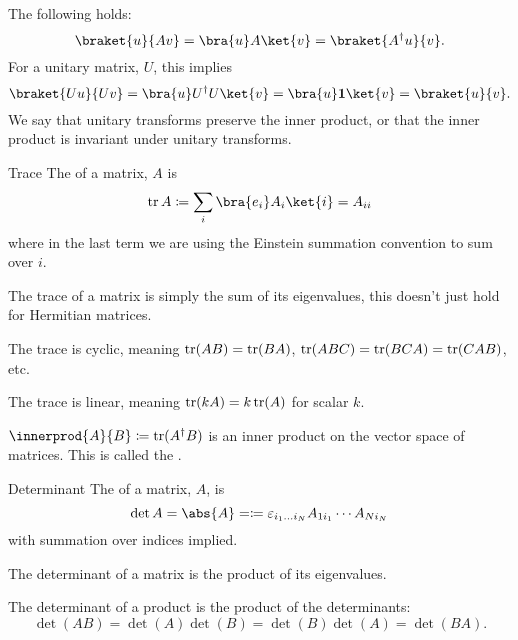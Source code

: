 The following holds:
\begin{equation}
    \braket{u}{Av} = \bra{u}A\ket{v} = \braket{A^\hermit u}{v}.
\end{equation}
For a unitary matrix, \(U\), this implies
\begin{equation}
    \braket{Uu}{Uv} = \bra{u}U^\hermit U\ket{v} = \bra{u}\ident \ket{v} = \braket{u}{v}.
\end{equation}
We say that unitary transforms preserve the inner product, or that the inner product is invariant under unitary transforms.

\begin{dfn}{Trace}{}
    The  of a matrix, \(A\) is
    \begin{equation}
        \tr A \coloneqq \sum_{i} \bra{e_i} A_i \ket{i} = A_{ii}
    \end{equation}
    where in the last term we are using the Einstein summation convention to sum over \(i\).
\end{dfn}

The trace of a matrix is simply the sum of its eigenvalues, this doesn't just hold for Hermitian matrices.

The trace is cyclic, meaning \(\operatorname{tr}(AB) = \operatorname{tr}(BA)\), \(\operatorname{tr}(ABC) = \operatorname{tr}(BCA) = \operatorname{tr}(CAB)\), etc.

The trace is linear, meaning \(\operatorname{tr}(k A) = k\operatorname{tr}(A)\) for scalar \(k\).

\(\innerprod{A}{B} \coloneqq \tr(A^\hermit B)\) is an inner product on the vector space of matrices.
This is called the .

\begin{dfn}{Determinant}{}
    The  of a matrix, \(A\), is 
    \begin{equation}
        \det A = \abs{A} = \coloneqq \varepsilon_{i_1\dotso i_N} A_{1i_1}\dotsm A_{Ni_N}
    \end{equation}
    with summation over indices implied.
\end{dfn}

The determinant of a matrix is the product of its eigenvalues.

The determinant of a product is the product of the determinants:
\begin{equation}
    \det(AB) = \det(A)\det(B) = \det(B)\det(A) = \det(BA).
\end{equation}

